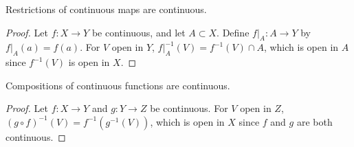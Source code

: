 \documentclass[10pt]{report}
\begin{document}
\begin{prop}
Restrictions of continuous maps are continuous.
\end{prop}
\begin{proof}
	Let $f:X\to Y$ be continuous, and let $A \subset X$. Define $f|_{A}:A\to Y$ by $f|_{A}(a)=f(a)$. For $V$ open in $Y$, $f|_{A}^{-1}(V) = f^{-1}(V) \cap A$, which is open in $A$ since $f^{-1}(V)$ is open in $X$.
\end{proof}

\begin{prop}
Compositions of continuous functions are continuous.
\end{prop}
\begin{proof}
	Let $f:X\to Y$ and $g:Y\to Z$ be continuous. For $V$ open in $Z$, $(g \circ f)^{-1}(V) = f^{-1}(g^{-1}(V))$, which is open in $X$ since $f$ and $g$ are both continuous.
\end{proof}
\end{document}
